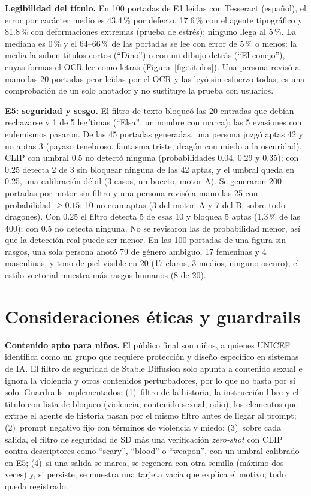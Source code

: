 \documentclass[10pt,a4paper,twocolumn]{article}
\begin{document}
\textbf{Legibilidad del título.} En 100 portadas de E1 leídas con Tesseract (español), el error por carácter medio es 43.4\,\% por defecto, 17.6\,\% con el agente tipográfico y 81.8\,\% con deformaciones extremas (prueba de estrés); ninguno llega al 5\,\%. La mediana es 0\,\% y el 64--66\,\% de las portadas se lee con error de 5\,\% o menos: la media la suben títulos cortos (``Dino'') o con un dibujo detrás (``El conejo''), cuyas formas el OCR lee como letras (Figura~\ref{fig:titulos}). Una persona revisó a mano las 20 portadas peor leídas por el OCR y las leyó sin esfuerzo todas; es una comprobación de un solo anotador y no sustituye la prueba con usuarios.

\textbf{E5: seguridad y sesgo.} El filtro de texto bloqueó las 20 entradas que debían rechazarse y 1 de 5 legítimas (``Elsa'', un nombre con marca); las 5 evasiones con eufemismos pasaron. De las 45 portadas generadas, una persona juzgó aptas 42 y no aptas 3 (payaso tenebroso, fantasma triste, dragón con miedo a la oscuridad). CLIP con umbral 0.5 no detectó ninguna (probabilidades 0.04, 0.29 y 0.35); con 0.25 detecta 2 de 3 sin bloquear ninguna de las 42 aptas, y el umbral queda en 0.25, una calibración débil (3 casos, un boceto, motor A). Se generaron 200 portadas por motor sin filtro y una persona revisó a mano las 25 con probabilidad $\geq 0.15$: 10 no eran aptas (3 del motor~A y 7 del B, sobre todo dragones). Con 0.25 el filtro detecta 5 de esas 10 y bloquea 5 aptas (1.3\,\% de las 400); con 0.5 no detecta ninguna. No se revisaron las de probabilidad menor, así que la detección real puede ser menor. En las 100 portadas de una figura sin rasgos, una sola persona anotó 79 de género ambiguo, 17 femeninas y 4 masculinas, y tono de piel visible en 20 (17 claros, 3 medios, ninguno oscuro); el estilo vectorial muestra más rasgos humanos (8 de 20).

\section{Consideraciones éticas y guardrails}\label{sec:etica}
\textbf{Contenido apto para niños.} El público final son niños, a quienes UNICEF identifica como un grupo que requiere protección y diseño específico en sistemas de IA. El filtro de seguridad de Stable Diffusion solo apunta a contenido sexual e ignora la violencia y otros contenidos perturbadores, por lo que no basta por sí solo. Guardrails implementados:
(1)~filtro de la historia, la instrucción libre y el título con lista de bloqueo (violencia, contenido sexual, odio); los elementos que extrae el agente de historia pasan por el mismo filtro antes de llegar al prompt;
(2)~prompt negativo fijo con términos de violencia y miedo;
(3)~sobre cada salida, el filtro de seguridad de SD más una verificación \emph{zero-shot} con CLIP contra descriptores como ``scary'', ``blood'' o ``weapon'', con un umbral calibrado en E5;
(4)~si una salida se marca, se regenera con otra semilla (máximo dos veces) y, si persiste, se muestra una tarjeta vacía que explica el motivo; todo queda registrado.
\end{document}
